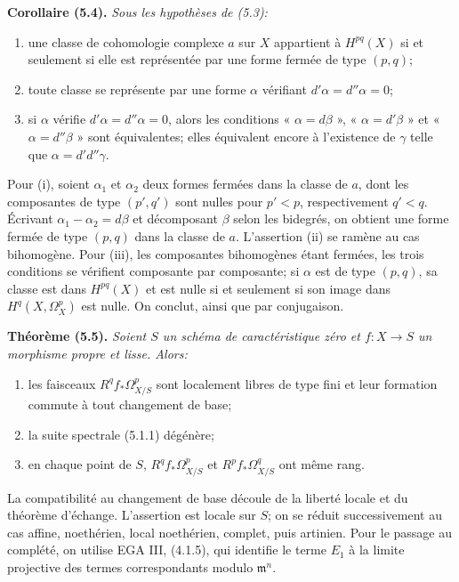 \documentclass[11pt]{article}
\newenvironment{named}[1]{\par\medskip\noindent\textbf{#1}\itshape}{\par\medskip}
\begin{document}
\begin{named}{Corollaire (5.4).}
Sous les hypothèses de (5.3):
\begin{enumerate}[label=(\roman*)]
\item une classe de cohomologie complexe $a$ sur $X$ appartient à $H^{pq}(X)$ si et seulement si elle est représentée par une forme fermée de type $(p,q)$;
\item toute classe se représente par une forme $\alpha$ vérifiant $d'\alpha=d''\alpha=0$;
\item si $\alpha$ vérifie $d'\alpha=d''\alpha=0$, alors les conditions « $\alpha=d\beta$ », « $\alpha=d'\beta$ » et « $\alpha=d''\beta$ » sont équivalentes; elles équivalent encore à l'existence de $\gamma$ telle que $\alpha=d'd''\gamma$.
\end{enumerate}
\end{named}
Pour (i), soient $\alpha_1$ et $\alpha_2$ deux formes fermées dans la classe de $a$, dont les composantes de type $(p',q')$ sont nulles pour $p'<p$, respectivement $q'<q$. Écrivant $\alpha_1-\alpha_2=d\beta$ et décomposant $\beta$ selon les bidegrés, on obtient une forme fermée de type $(p,q)$ dans la classe de $a$. L'assertion (ii) se ramène au cas bihomogène. Pour (iii), les composantes bihomogènes étant fermées, les trois conditions se vérifient composante par composante; si $\alpha$ est de type $(p,q)$, sa classe est dans $H^{pq}(X)$ et est nulle si et seulement si son image dans $H^q(X,\Omega^p_X)$ est nulle. On conclut, ainsi que par conjugaison.

\begin{named}{Théorème (5.5).}
Soient $S$ un schéma de caractéristique zéro et $f:X\to S$ un morphisme propre et lisse. Alors:
\begin{enumerate}[label=(\roman*)]
\item les faisceaux $R^qf_*\Omega^p_{X/S}$ sont localement libres de type fini et leur formation commute à tout changement de base;
\item la suite spectrale (5.1.1) dégénère;
\item en chaque point de $S$, $R^qf_*\Omega^p_{X/S}$ et $R^pf_*\Omega^q_{X/S}$ ont même rang.
\end{enumerate}
\end{named}
La compatibilité au changement de base découle de la liberté locale et du théorème d'échange. L'assertion est locale sur $S$; on se réduit successivement au cas affine, noethérien, local noethérien, complet, puis artinien. Pour le passage au complété, on utilise EGA III, (4.1.5), qui identifie le terme $E_1$ à la limite projective des termes correspondants modulo $\mathfrak m^n$.
\end{document}

